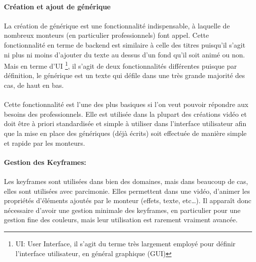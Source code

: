 \paragraph{Création et ajout de générique}

\paragraph{}

La création de générique est une fonctionnalité indispensable, à laquelle de
nombreux monteurs (en particulier professionnels) font appel. Cette
fonctionnalité en terme de backend est similaire à
celle des titres puisqu'il s'agit ni plus ni moins d'ajouter du
texte au dessus d'un fond qu'il soit animé ou non. Mais en terme d'UI
\footnote{UI: User Interface, il s'agit du terme  très largement
employé pour définir l'interface utilisateur, en général graphique (GUI)},
il s'agit de deux fonctionnalités différentes puisque par définition,
le générique est un texte qui défile dans une très grande majorité
des cas, de haut en bas.

\paragraph{}

Cette fonctionnalité est l'une des plus basiques si
l'on veut pouvoir répondre aux besoins des professionnels. Elle est utilisée
dans la plupart des créations vidéo et doit être à priori standardisée et
simple à utiliser dans l'interface utilisateur afin que la mise en place
des génériques (déjà écrits) soit effectuée de manière simple et rapide
par les monteurs.

\paragraph{Gestion des Keyframes:}

\paragraph{}

Les keyframes sont utilisées dans bien des domaines, mais dans beaucoup de cas, elles sont
utilisées avec parcimonie. Elles permettent dans une vidéo, d'animer les propriétés
d'éléments ajoutés par le monteur (effets, texte, etc\ldots). Il
apparaît donc nécessaire d'avoir une gestion minimale des keyframes,
en particulier pour une gestion fine des couleurs, mais leur utilisation est
rarement vraiment avancée.

